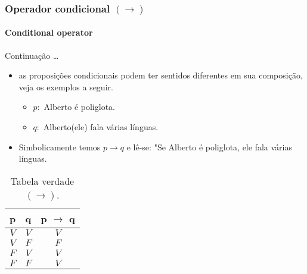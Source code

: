 \begin{frame}[t]
    \frametitle{Operador condicional $(\rightarrow)$ }
    \framesubtitle{Conditional operator}
    \begin{block}{Continuação \dots}
        \begin{itemize}
            \item as proposições condicionais podem ter sentidos diferentes em sua composição, veja os exemplos a seguir.
            \begin{itemize}
                \item[] $p:$ Alberto é poliglota.
                \item[] $q:$ Alberto(ele) fala várias línguas.
            \end{itemize}
            \item Simbolicamente temos $p \rightarrow q$ e lê-se: "Se Alberto é poliglota, ele fala várias línguas.
        \end{itemize}
    \end{block}
    \vspace{-5mm}
    \begin{table}[ht]
        \caption{Tabela verdade $(\rightarrow)$.}
        \label{tab:tabela-condicao}
        \begin{tabular}{|c|c|c|}
        \hline
        \rowcolor[HTML]{EFEFEF} 
        \textbf{p} & \textbf{q} & \textbf{p $\rightarrow$ q} \\ \hline
        $V$        & $V$        & $V$                        \\ \hline
        $V$        & $F$        & $F$                        \\ \hline
        $F$        & $V$        & $V$                        \\ \hline
        $F$        & $F$        & $V$                        \\ \hline
        \end{tabular}
    \end{table}
\end{frame}
%
